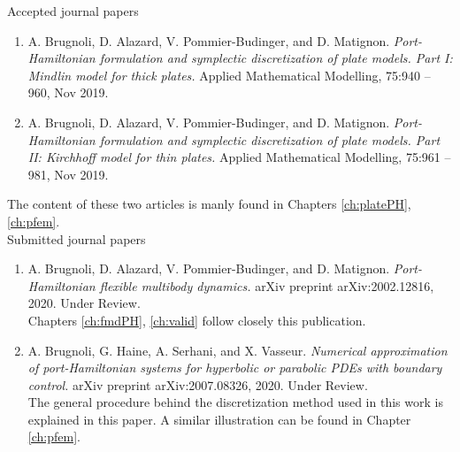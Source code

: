 Accepted journal papers \cite{brugnoli2019ammmin,brugnoli2019ammkir}
\begin{enumerate}
\item A. Brugnoli, D. Alazard, V. Pommier-Budinger, and D. Matignon. \textit{Port-Hamiltonian formulation and symplectic discretization of plate models. Part I: Mindlin model for thick plates.} Applied Mathematical Modelling, 75:940 – 960, Nov 2019. 
\item A. Brugnoli, D. Alazard, V. Pommier-Budinger, and D. Matignon. \textit{Port-Hamiltonian formulation and symplectic discretization of plate models. Part II: Kirchhoff model for thin plates.} Applied Mathematical Modelling, 75:961 – 981, Nov 2019. 
\end{enumerate}
The content of these two articles is manly found in Chapters \ref{ch:platePH}, \ref{ch:pfem}. \\

Submitted journal papers \cite{brugnoli2020msd,brugnoli2020numerical}
\begin{enumerate}
\item A. Brugnoli, D. Alazard, V. Pommier-Budinger, and D. Matignon. \textit{Port-Hamiltonian flexible multibody dynamics.} arXiv preprint arXiv:2002.12816, 2020. Under Review. \\
Chapters \ref{ch:fmdPH}, \ref{ch:valid} follow closely this publication.
\item A. Brugnoli, G. Haine, A. Serhani, and X. Vasseur. \textit{Numerical approximation of port-Hamiltonian systems for hyperbolic or parabolic PDEs with boundary control.} arXiv preprint arXiv:2007.08326, 2020. Under Review. \\
The general procedure behind the discretization method used in this work is explained in this paper. A similar illustration can be found in Chapter \ref{ch:pfem}.
\end{enumerate}

